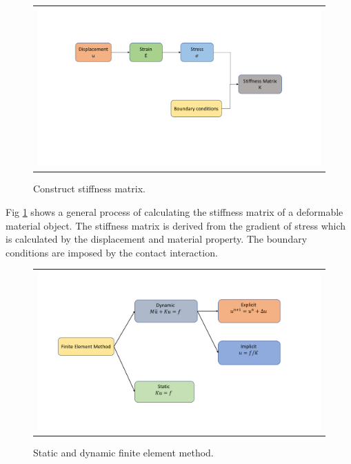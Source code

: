 \begin{figure}[H]
	\centering
	\begin{tabular}{c}
		\includegraphics[width=1.0\textwidth]{./pics/construct_matrix}
	\end{tabular}
	\caption{\footnotesize Construct stiffness matrix.} \label{fig: ch1f2}
\end{figure}

Fig \ref{fig: ch1f2} shows a general process of calculating the stiffness matrix of a deformable material object. The stiffness matrix is derived from the gradient of stress which is calculated by the displacement and material property. The boundary conditions are imposed by the contact interaction.

\begin{figure}[H]
	\centering
	\begin{tabular}{c}
		\includegraphics[width=1.0\textwidth]{./pics/fem}
	\end{tabular}
	\caption{\footnotesize Static and dynamic finite element method.} \label{fig: ch1f3}
\end{figure}

